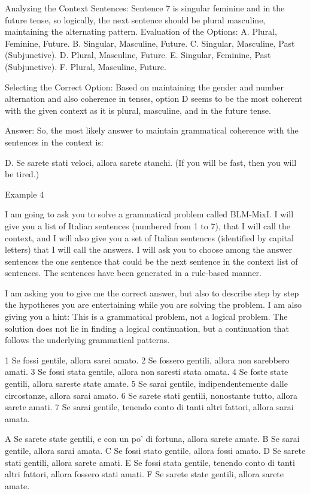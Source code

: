 Analyzing the Context Sentences:
Sentence 7 is singular feminine and in the future tense, so logically, the next sentence should be plural masculine, maintaining the alternating pattern.
Evaluation of the Options:
A. Plural, Feminine, Future.
B. Singular, Masculine, Future.
C. Singular, Masculine, Past (Subjunctive).
D. Plural, Masculine, Future.
E. Singular, Feminine, Past (Subjunctive).
F. Plural, Masculine, Future.

Selecting the Correct Option:
Based on maintaining the gender and number alternation and also coherence in tenses, option D seems to be the most coherent with the given context as it is plural, masculine, and in the future tense.

Answer:
So, the most likely answer to maintain grammatical coherence with the sentences in the context is:

D. Se sarete stati veloci, allora sarete stanchi. (If you will be fast, then you will be tired.)

Example 4

I am going to ask you to solve a grammatical problem called BLM-MixI.  I will give you a list of Italian sentences (numbered from 1 to 7), that I will call the context, and I will also give you a set of Italian sentences (identified by capital letters) that I will call  the answers. I will ask you to choose among the answer sentences the one sentence that could be the next sentence in the context list of sentences. The sentences have been generated in a rule-based manner. 

I am asking you to give me the correct answer, but also to describe step by step  the hypotheses you are entertaining while you are solving the problem.
I am also giving you a hint: This is a grammatical problem, not a logical problem. The solution does not lie in finding a logical continuation, but a continuation that follows the underlying grammatical patterns.


1 Se fossi gentile, allora sarei amato.
2 Se fossero gentili, allora non sarebbero amati.
3 Se fossi stata gentile, allora non saresti stata amata.
4 Se foste state gentili, allora sareste state amate.
5 Se sarai gentile, indipendentemente dalle circostanze, allora sarai amato.
6 Se sarete stati gentili, nonostante tutto, allora sarete amati.
7 Se sarai gentile, tenendo conto di tanti altri fattori, allora sarai amata.

A Se sarete state gentili, e con un po' di fortuna, allora sarete amate.
B Se sarai gentile, allora sarai amata.
C Se fossi stato gentile, allora fossi amato.
D Se sarete stati gentili, allora sarete amati.
E Se fossi stata gentile, tenendo conto di tanti altri fattori, allora fossero stati amati.
F Se sarete state gentili, allora sarete amate.

